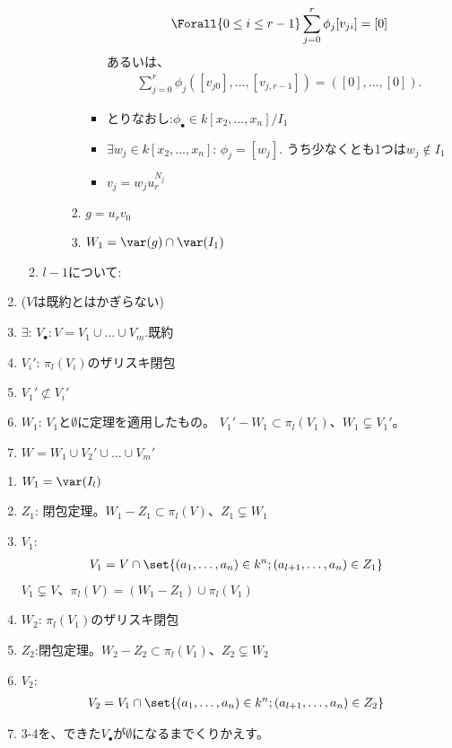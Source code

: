 \begin{enumerate}
\begin{enumerate}
\begin{enumerate}
\begin{enumerate}
\begin{itemize}
        \begin{align}
          \Forall{0\le i \le r-1} \sum_{j=0}^r \phi_j [v_{ji}] = [0]
        \end{align}
        あるいは、
        \begin{align}
          \sum_{j=0}^r \phi_j ([v_{j0}],\dots,[v_{j,r-1}]) = ([0],\dots, [0]).
        \end{align}
        \item
        とりなおし:$\phi_\bullet \in k[x_2,\dots,x_n]/I_1$
        \item
        $\exists w_j \in k[x_2,\dots,x_n]$: $\phi_j = [w_j]$.
        うち少なくとも1つは$w_j \notin I_1$
        \item
        $ v_j = w_j u_r^{N_j}$
      \end{itemize}
      \item $g=u_r v_0$
      \item $W_1 = \var(g) \cap \var(I_1)$
    \end{enumerate}
  \end{enumerate}
  \item $l-1$について:
  \end{enumerate}
  \item ($V$は既約とはかぎらない)
  \item $\exists$: $V_\bullet: V = V_1\cup \dots \cup V_m.$既約
  \item
  $V_i'$: $\pi_l(V_i)$のザリスキ閉包
  \item
  $V_1' \not\subset V_i'$
  \item
  $W_1$: $V_1$と$\emptyset$に定理を適用したもの。
  $V_1' - W_1 \subset \pi_l(V_1)$、$W_1 \subsetneq V_1'$。
  \item
  $W = W_1 \cup V_2' \cup \dots \cup V_m'$
\end{enumerate}

\begin{enumerate}
  \item $W_1 = \var(I_l)$
  \item
  $Z_1$: 閉包定理。$W_1 - Z_1 \subset \pi_l(V)$、$Z_1 \subsetneq W_1$
  \item $V_1$:
  \begin{align}
    V_1 = V \cap \set{(a_1,\dots,a_n)\in k^n; (a_{l+1},\dots,a_n)\in Z_1}
  \end{align}
  $V_1 \subsetneq V$、$\pi_l(V) = (W_1-Z_1) \cup \pi_l(V_1)$
  \item
  $W_2$: $\pi_l(V_1)$のザリスキ閉包
  \item
  $Z_2$:閉包定理。$W_2 - Z_2 \subset \pi_l(V_1)$、$Z_2 \subsetneq W_2$
  \item
  $V_2$:
  \begin{align}
    V_2 = V_1 \cap \set{(a_1,\dots,a_n)\in k^n; (a_{l+1},\dots,a_n)\in Z_2}
  \end{align}
  \item
  3-4を、できた$V_\bullet$が$\emptyset$になるまでくりかえす。
\end{enumerate}

